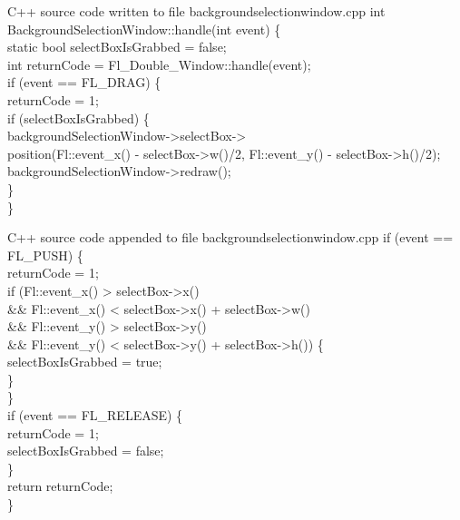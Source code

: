 \documentclass{article}
\begin{document}
\begin{GFT}{C++ source code written to file backgroundselectionwindow.cpp}
\+int BackgroundSelectionWindow::handle(int event) \{\\
\+    static bool selectBoxIsGrabbed = false;\\
\+    int returnCode = Fl\_Double\_Window::handle(event);\\
\+    if (event == FL\_DRAG) \{\\
\+        returnCode = 1;\\
\+        if (selectBoxIsGrabbed) \{\\
\+            backgroundSelectionWindow->selectBox->\\
\+                  position(Fl::event\_x() - selectBox->w()/2,                                         Fl::event\_y() - selectBox->h()/2);\\
\+            backgroundSelectionWindow->redraw();\\
\+        \}\\
\+    \}\\
\end{GFT}
\clearpage
\begin{GFT}{C++ source code appended to file backgroundselectionwindow.cpp}
\+    if (event == FL\_PUSH) \{\\
\+        returnCode = 1;\\
\+        if (Fl::event\_x() > selectBox->x()\\
\+         \&\& Fl::event\_x() < selectBox->x() + selectBox->w()\\
\+         \&\& Fl::event\_y() > selectBox->y()\\
\+         \&\& Fl::event\_y() < selectBox->y() + selectBox->h()) \{\\
\+            selectBoxIsGrabbed = true;\\
\+        \}\\
\+    \}\\
\+    if (event == FL\_RELEASE) \{\\
\+        returnCode = 1;\\
\+        selectBoxIsGrabbed = false;\\
\+    \}\\
\+    return returnCode;\\
\+\}\\
\end{GFT}
\clearpage
\end{document}
